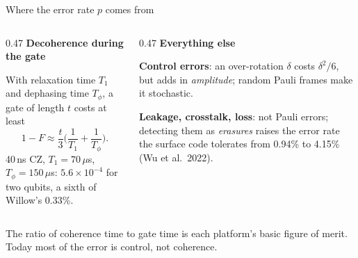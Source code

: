 \documentclass[aspectratio=169,11pt]{beamer}
\newcommand{\blocktitle}[1]{{\bfseries #1}\par\vskip1mm}
\begin{document}
\begin{frame}{Where the error rate $p$ comes from}
  \begin{columns}[T]
    \begin{column}{0.47\textwidth}
      \blocktitle{Decoherence during the gate}
      With relaxation time $T_1$ and dephasing time $T_\phi$, a gate of length $t$ costs at least
      \[ 1-F\approx\frac t3\Big(\frac1{T_1}+\frac1{T_\phi}\Big) . \]
      {\small 40\,ns CZ, $T_1=70\,\mu$s, $T_\phi=150\,\mu$s: $5.6\times10^{-4}$ for two qubits, a sixth of Willow's 0.33\%.}
    \end{column}
    \begin{column}{0.47\textwidth}
      \blocktitle{Everything else}
      \textbf{Control errors}: an over-rotation $\delta$ costs $\delta^2/6$, but adds in \emph{amplitude}; random Pauli frames make it stochastic.\par
      \textbf{Leakage, crosstalk, loss}: not Pauli errors; detecting them as \emph{erasures} raises the error rate the surface code tolerates from 0.94\% to 4.15\% (Wu et al.\ 2022).
    \end{column}
  \end{columns}
  \begin{takeaway}The ratio of coherence time to gate time is each platform's basic figure of merit. Today most of the error is control, not coherence.\end{takeaway}
\end{frame}
\end{document}
